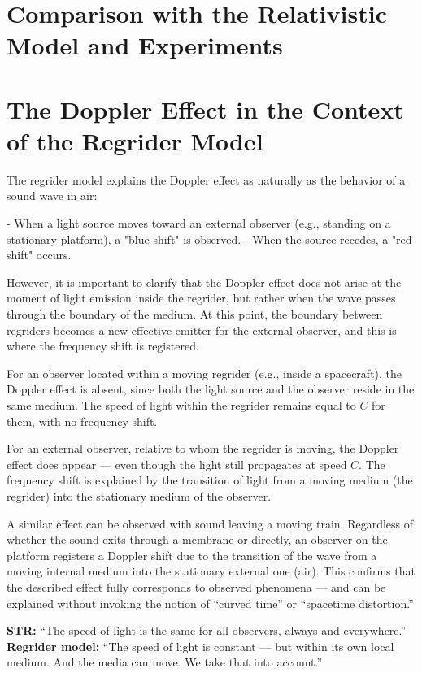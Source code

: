 \documentclass[12pt]{article}
\begin{document}
\section*{Comparison with the Relativistic Model and Experiments}
\section*{The Doppler Effect in the Context of the Regrider Model}

The regrider model explains the Doppler effect as naturally as the behavior of a sound wave in air:

- When a light source moves toward an external observer (e.g., standing on a stationary platform), a "blue shift" is observed.
- When the source recedes, a "red shift" occurs.

However, it is important to clarify that the Doppler effect does not arise at the moment of light emission inside the regrider, but rather when the wave passes through the boundary of the medium. At this point, the boundary between regriders becomes a new effective emitter for the external observer, and this is where the frequency shift is registered.

For an observer located within a moving regrider (e.g., inside a spacecraft), the Doppler effect is absent, since both the light source and the observer reside in the same medium. The speed of light within the regrider remains equal to $C$ for them, with no frequency shift.

For an external observer, relative to whom the regrider is moving, the Doppler effect does appear — even though the light still propagates at speed $C$. The frequency shift is explained by the transition of light from a moving medium (the regrider) into the stationary medium of the observer.

A similar effect can be observed with sound leaving a moving train. Regardless of whether the sound exits through a membrane or directly, an observer on the platform registers a Doppler shift due to the transition of the wave from a moving internal medium into the stationary external one (air). This confirms that the described effect fully corresponds to observed phenomena — and can be explained without invoking the notion of “curved time” or “spacetime distortion.”

\textbf{STR:} “The speed of light is the same for all observers, always and everywhere.”\\
\textbf{Regrider model:} “The speed of light is constant — but within its own local medium. And the media can move. We take that into account.”
\end{document}
